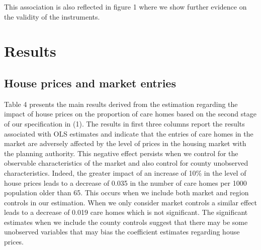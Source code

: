 \documentclass[12pt,letterpaper]{article}
\begin{document}
This association is also reflected in figure 1 where we show further evidence on the validity of the instruments. 


\section{Results}
\label{sec: results}

\subsection{House prices and market entries}

Table 4 presents the main results derived from the estimation regarding the impact 
of house prices on the proportion of care homes based on the second stage of our 
specification in (1). The results in first three columns report the results associated
 with OLS estimates and indicate that the entries of care homes in the market are
  adversely affected by the level of prices in the housing market with the planning
   authority. This negative effect persists when we control for the observable 
   characteristics of the market and also control for county unobserved characteristics.
    Indeed, the greater impact of an increase of 10\% in the level of house prices leads to a decrease 
    of 0.035 in the number of care homes per 1000 population older than 65. This occurs when 
    we include both market and region controls in our estimation. When we only consider market
     controls a similar effect leads to a decrease of 0.019 care homes which is not significant. 
     The significant estimates when we include the county controls suggest that there may 
     be some unobserved variables that may bias the coefficient estimates regarding house prices. 
\end{document}
